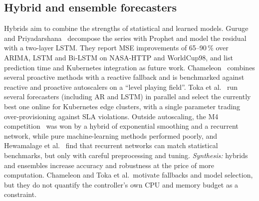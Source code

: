 \documentclass[conference,a4paper]{IEEEtran}
\begin{document}
\subsection{Hybrid and ensemble forecasters}
Hybrids aim to combine the strengths of statistical and learned models. Guruge and
Priyadarshana~\cite{guruge2025} decompose the series with Prophet and model the residual with a two-layer LSTM.
They report MSE improvements of 65--90\,\% over ARIMA, LSTM and Bi-LSTM on NASA-HTTP and WorldCup98, and list
prediction time and Kubernetes integration as future work. Chameleon~\cite{bauer2019} combines several
proactive methods with a reactive fallback and is benchmarked against reactive and proactive autoscalers on a
``level playing field''. Toka et al.~\cite{toka2021} run several forecasters (including AR and LSTM) in parallel
and select the currently best one online for Kubernetes edge clusters, with a single parameter trading
over-provisioning against SLA violations. Outside autoscaling, the M4 competition~\cite{makridakis2020} was won
by a hybrid of exponential smoothing and a recurrent network, while pure machine-learning methods performed poorly,
and Hewamalage et al.~\cite{hewamalage2021} find that recurrent networks can match statistical benchmarks, but
only with careful preprocessing and tuning. \emph{Synthesis:} hybrids and ensembles increase accuracy and
robustness at the price of more computation. Chameleon and Toka et al.\ motivate fallbacks and model selection,
but they do not quantify the controller's own CPU and memory budget as a constraint.
\end{document}
